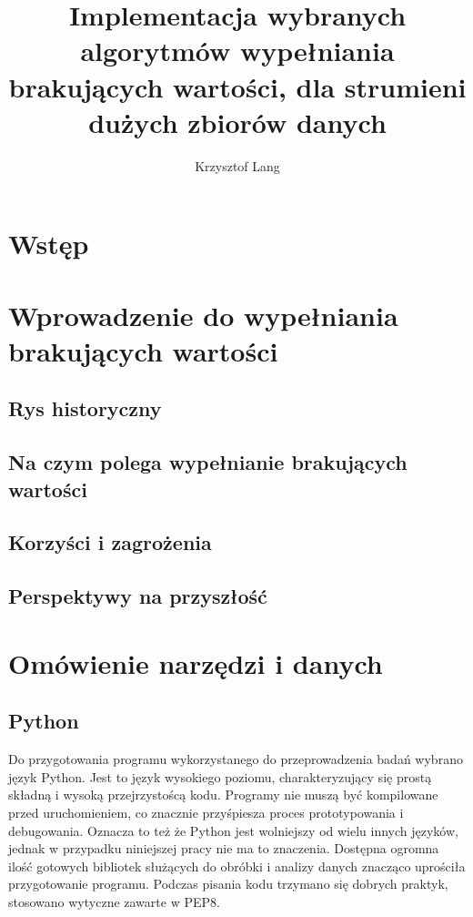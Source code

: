 \documentclass[12pt,twoside]{article}
\author{Krzysztof Lang}
\title{Implementacja wybranych algorytmów wypełniania brakujących wartości, dla strumieni dużych zbiorów danych}
\begin{document}
\maketitle

\blankpage

\tableofcontents
\clearpage
\blankpage


\section{Wstęp}
\clearpage


\section{Wprowadzenie do wypełniania brakujących wartości}

\subsection{Rys historyczny}
\subsection{Na czym polega wypełnianie brakujących wartości}
\subsection{Korzyści i zagrożenia}
\subsection{Perspektywy na przyszłość}
\clearpage


\section{Omówienie narzędzi i danych}

\subsection{Python}

Do przygotowania programu wykorzystanego do przeprowadzenia badań wybrano język Python.
Jest to język wysokiego poziomu, charakteryzujący się prostą składną i wysoką przejrzystoścą kodu.
Programy nie muszą być kompilowane przed uruchomieniem, co znacznie przyśpiesza proces prototypowania i debugowania.
Oznacza to też że Python jest wolniejszy od wielu innych języków, jednak w przypadku niniejszej pracy nie ma to znaczenia.
Dostępna ogromna ilość gotowych bibliotek służących do obróbki i analizy danych znacząco uprościła przygotowanie programu.
Podczas pisania kodu trzymano się dobrych praktyk, stosowano wytyczne zawarte w PEP8.
\end{document}
